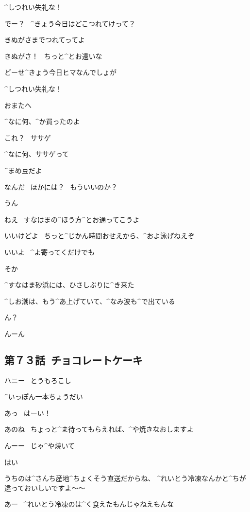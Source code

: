 \Makki ^{しつれい}{失礼}な！

\Takahiro でー？
\ ^{きょう}{今日}はどこつれてけって？

\Makki きぬがさまでつれてってよ

\Takahiro きぬがさ！
\ ちっと^{とお}{遠}いな

\Makki どーせ^{きょう}{今日}ヒマなんでしょが

\Takahiro ^{しつれい}{失礼}な！

\page[96]
\Makki おまたへ

\Takahiro ^{なに}{何}、^{か}{買}ったのよ

\Makki これ？
\ ササゲ

\Takahiro ^{なに}{何}、ササゲって

\Makki ^{まめ}{豆}だよ

\Takahiro なんだ
\ ほかには？
\ もういいのか？

\Makki うん

\page[97]
\Makki ねえ
\ すなはまの^{ほう}{方}^{とお}{通}ってこうよ

\Takahiro いいけどよ
\ ちっと^{じかん}{時間}おせえから、^{およ}{泳}げねえぞ

\Makki いいよ
\ ^{よ}{寄}ってくだけでも

\Takahiro そか

\page[98]
\Takahiro ^{すなはま}{砂浜}には、ひさしぶりに^{き}{来}た

\Takahiro ^{しお}{潮}は、もう^{あ}{上}げていて、^{なみ}{波}も^{で}{出}ている

\page[102]
\Makki ん？

\Takahiro んーん


\subsection{第７３話\ チョコレートケーキ}

\page[104]
\Sign ハニー
\ とうもろこし

\Person ^{いっぽん}{一本}ちょうだい

\Alpha あっ
\ はーい！

\page[105]
\Alpha あのね
\ ちょっと^{ま}{待}ってもらえれば、^{や}{焼}きなおしますよ

\Person んーー
\ じゃ^{や}{焼}いて

\Alpha はい

\Alpha うちのは^{さんち}{産地}^{ちょくそう}{直送}だからね、
^{れいとう}{冷凍}なんかと^{ちが}{違}っておいしいですよ〜〜

\Person あー
\ ^{れいとう}{冷凍}のは^{く}{食}えたもんじゃねえもんな

